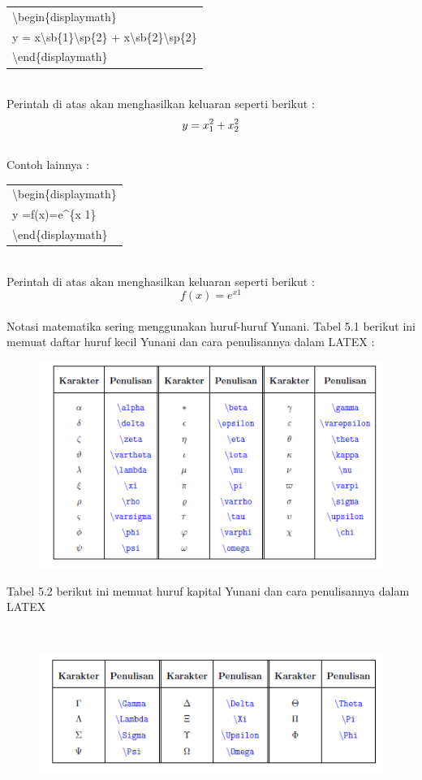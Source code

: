 \begin{tabular}{|p{13.5 cm}|}
\hline
\textbackslash begin\{displaymath\}\\
    y = x\textbackslash sb\{1\}\textbackslash sp\{2\} + x\textbackslash sb\{2\}\textbackslash sp\{2\}\\
\textbackslash end\{displaymath\}\\
\hline
\end{tabular}\\[0.5 cm]
Perintah di atas akan menghasilkan keluaran seperti berikut :\\[0.5 cm]
\begin{displaymath}
    y = x\sb{1}\sp{2} + x\sb{2}\sp{2}
\end{displaymath}\\[0.5 cm]
Contoh lainnya :\\[0.5 cm]
\begin{tabular}{|p{13.5 cm}|}
\hline
\textbackslash begin\{displaymath\}\\
    y =f(x)=e\^{}\{x 1\}\\
\textbackslash end\{displaymath\}\\
\hline
\end{tabular}\\[0.5 cm]
Perintah di atas akan menghasilkan keluaran seperti berikut :\\[0.5 cm]
\begin{displaymath}
f(x)=e^{x1}	
\end{displaymath}\\[0.5 cm]
Notasi matematika sering menggunakan huruf-huruf Yunani. Tabel 5.1 berikut ini memuat daftar huruf kecil Yunani dan cara penulisannya dalam LATEX :\\
\begin{figure}[h!]
\centering
\includegraphics[width=10 cm]{img/10.png}
\end{figure}
\begin{raggedleft}Tabel 5.2 berikut ini memuat huruf kapital Yunani dan cara penulisannya dalam  LATEX\end{raggedleft}\\[0.5 cm]
\begin{figure}[h!]
\centering
\includegraphics[width=10 cm]{img/11.png}
\end{figure}
